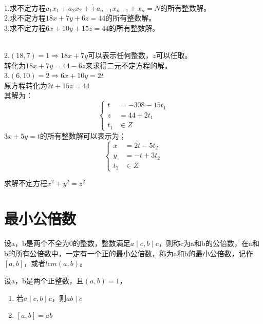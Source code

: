 \documentclass[cn,10pt]{elegantbook}
\begin{document}
\begin{example}
  \\
  1.求不定方程$a_1x_1+a_2x_2+ \dot +a_{n-1}x_{n-1}+x_n = N$的所有整数解。\\
  2.求不定方程$18x+7y+6z = 44$的所有整数解。\\
  3.求不定方程$6x+10y+15z = 44$的所有整数解。
\end{example}
\begin{solution}
  \\2.$(18,7) = 1 \Rightarrow 18x+7y$可以表示任何整数，$z$可以任取。\\
  转化为$18x+7y = 44 -6z$来求得二元不定方程的解。\\
  3.$(6,10) =2 \Rightarrow 6x +10y = 2t$\\
  原方程转化为$2t+15z = 44$\\
  其解为：
  $$
  \left\{
    \begin{aligned}
      t &=-308-15t_1\\
      z &= 44+2t_1\\
      t_1 & \in Z
    \end{aligned}
  \right.
  $$
  $3x+5y = t$的所有整数解可以表示为；
  $$
  \left\{
    \begin{aligned}
      x &=2t-5t_2\\
      y &=-t+3t_2\\
      t_2 & \in Z
    \end{aligned}
  \right.
  $$
\end{solution}
\begin{exercise}
  求解不定方程$x^2+y^2=z^2$
\end{exercise}

\section{最小公倍数}
\begin{definition}
  设a，b是两个不全为0的整数，整数满足$a \mid c, b \mid c$，则称c为a和b的公倍数，在a和b的所有公倍数中，一定有一个正的最小公倍数，称为a和b的最小公倍数，记作$[a,b]$，或者$lcm(a,b)$。
\end{definition}

\begin{theorem}
  设a，b是两个正整数，且$(a,b) = 1$，
  \begin{enumerate}[(1)]
    \item 若$a \mid c,b \mid c$，则$ab \mid c$
    \item $[a,b] = ab$
  \end{enumerate}
\end{theorem}
\end{document}
